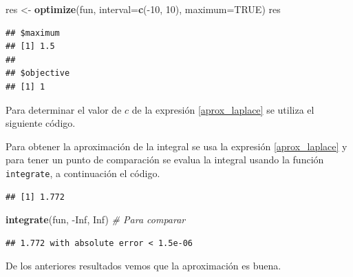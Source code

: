 \documentclass[10pt,]{krantz}
\makeatletter
\newenvironment{Shaded}{\begin{snugshade}}{\end{snugshade}}
\newcommand{\KeywordTok}[1]{\textcolor[rgb]{0.13,0.29,0.53}{\textbf{{#1}}}}
\newcommand{\DataTypeTok}[1]{\textcolor[rgb]{0.13,0.29,0.53}{{#1}}}
\newcommand{\DecValTok}[1]{\textcolor[rgb]{0.00,0.00,0.81}{{#1}}}
\newcommand{\StringTok}[1]{\textcolor[rgb]{0.31,0.60,0.02}{{#1}}}
\newcommand{\CommentTok}[1]{\textcolor[rgb]{0.56,0.35,0.01}{\textit{{#1}}}}
\newcommand{\OtherTok}[1]{\textcolor[rgb]{0.56,0.35,0.01}{{#1}}}
\newcommand{\NormalTok}[1]{{#1}}
\newenvironment{kframe}{%
\medskip{}
\setlength{\fboxsep}{.8em}
 \def\at@end@of@kframe{}%
 \ifinner\ifhmode%
  \def\at@end@of@kframe{\end{minipage}}%
  \begin{minipage}{\columnwidth}%
 \fi\fi%
 \def\FrameCommand##1{\hskip\@totalleftmargin \hskip-\fboxsep
 \colorbox{shadecolor}{##1}\hskip-\fboxsep
     \hskip-\linewidth \hskip-\@totalleftmargin \hskip\columnwidth}%
 \MakeFramed {\advance\hsize-\width
   \@totalleftmargin\z@ \linewidth\hsize
   \@setminipage}}%
 {\par\unskip\endMakeFramed%
 \at@end@of@kframe}
\renewenvironment{Shaded}{\begin{kframe}}{\end{kframe}}
\makeatother
\begin{document}
\begin{Shaded}
\begin{Highlighting}[]
\NormalTok{res <-}\StringTok{ }\KeywordTok{optimize}\NormalTok{(fun, }\DataTypeTok{interval=}\KeywordTok{c}\NormalTok{(-}\DecValTok{10}\NormalTok{, }\DecValTok{10}\NormalTok{), }\DataTypeTok{maximum=}\OtherTok{TRUE}\NormalTok{)}
\NormalTok{res}
\end{Highlighting}
\end{Shaded}

\begin{verbatim}
## $maximum
## [1] 1.5
## 
## $objective
## [1] 1
\end{verbatim}

Para determinar el valor de \(c\) de la expresión \ref{aprox_laplace} se
utiliza el siguiente código.

\begin{Shaded}
\end{Shaded}

Para obtener la aproximación de la integral se usa la expresión
\ref{aprox_laplace} y para tener un punto de comparación se evalua la
integral usando la función \texttt{integrate}, a continuación el código.

\begin{Shaded}
\end{Shaded}

\begin{verbatim}
## [1] 1.772
\end{verbatim}

\begin{Shaded}
\begin{Highlighting}[]
\KeywordTok{integrate}\NormalTok{(fun, -}\OtherTok{Inf}\NormalTok{, }\OtherTok{Inf}\NormalTok{)  }\CommentTok{# Para comparar}
\end{Highlighting}
\end{Shaded}

\begin{verbatim}
## 1.772 with absolute error < 1.5e-06
\end{verbatim}

De los anteriores resultados vemos que la aproximación es buena.



\backmatter
\printindex
\end{document}
